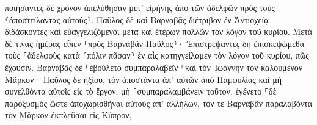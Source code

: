 \documentclass{openreader}
\begin{document}
ποιήσαντες δὲ χρόνον ἀπελύθησαν μετ’ εἰρήνης ἀπὸ τῶν ἀδελφῶν πρὸς τοὺς ⸂ἀποστείλαντας αὐτούς⸃. 
Παῦλος δὲ καὶ Βαρναβᾶς διέτριβον ἐν Ἀντιοχείᾳ διδάσκοντες καὶ εὐαγγελιζόμενοι μετὰ καὶ ἑτέρων πολλῶν τὸν λόγον τοῦ κυρίου. 
Μετὰ δέ τινας ἡμέρας εἶπεν ⸂πρὸς Βαρναβᾶν Παῦλος⸃· Ἐπιστρέψαντες δὴ ἐπισκεψώμεθα τοὺς ⸀ἀδελφοὺς κατὰ ⸂πόλιν πᾶσαν⸃ ἐν αἷς κατηγγείλαμεν τὸν λόγον τοῦ κυρίου, πῶς ἔχουσιν. 
Βαρναβᾶς δὲ ⸀ἐβούλετο συμπαραλαβεῖν ⸀καὶ τὸν Ἰωάννην τὸν καλούμενον Μᾶρκον· 
Παῦλος δὲ ἠξίου, τὸν ἀποστάντα ἀπ’ αὐτῶν ἀπὸ Παμφυλίας καὶ μὴ συνελθόντα αὐτοῖς εἰς τὸ ἔργον, μὴ ⸀συμπαραλαμβάνειν τοῦτον. 
ἐγένετο ⸀δὲ παροξυσμὸς ὥστε ἀποχωρισθῆναι αὐτοὺς ἀπ’ ἀλλήλων, τόν τε Βαρναβᾶν παραλαβόντα τὸν Μᾶρκον ἐκπλεῦσαι εἰς Κύπρον, 
\end{document}

